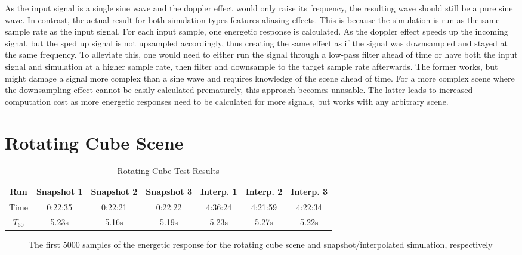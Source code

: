 As the input signal is a single sine wave and the doppler effect would only raise its frequency,
the resulting wave should still be a pure sine wave.
In contrast, the actual result for both simulation types features aliasing effects.
\newline
This is because the simulation is run as the same sample rate as the input signal.
For each input sample, one energetic response is calculated.
As the doppler effect speeds up the incoming signal,
but the sped up signal is not upsampled accordingly,
thus creating the same effect as if the signal was downsampled and stayed at the same frequency.
\newline
To alleviate this, one would need to either run the signal through a low-pass filter ahead of time
or have both the input signal and simulation at a higher sample rate,
then filter and downsample to the target sample rate afterwards.
\newline
The former works, but might damage a signal more complex than a sine wave
and requires knowledge of the scene ahead of time.
For a more complex scene where the downsampling effect cannot be easily calculated prematurely,
this approach becomes unusable.
\newline
The latter leads to increased computation cost as more energetic responses need to be calculated for more signals,
but works with any arbitrary scene.

\section{Rotating Cube Scene}

\begin{table}[t!]
    \centering
    \begin{tabular}{| c | c | c | c | c | c | c |}
        \hline
        Run        & Snapshot 1 & Snapshot 2 & Snapshot 3 & Interp. 1 & Interp. 2 & Interp. 3 \\
        \hline
        Time       & 0:22:35    & 0:22:21    & 0:22:22    & 4:36:24   & 4:21:59   & 4:22:34   \\
        \hline
        \(T_{60}\) & 5.23s      & 5.16s      & 5.19s      & 5.23s     & 5.27s     & 5.22s     \\
        \hline
    \end{tabular}
    \caption{Rotating Cube Test Results}\label{tbl:CubeSceneTable}
\end{table}

\begin{figure}[t!]
    \begin{center}
        
    \end{center}
    \caption{The first 5000 samples of the energetic response for the rotating cube scene and snapshot/interpolated simulation, respectively}\label{fig:CubeSceneIR}
\end{figure}

